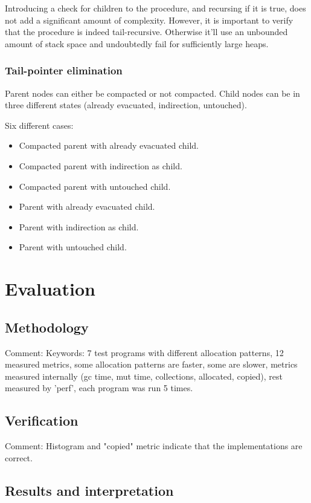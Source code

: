 \documentclass[a4paper,oneside]{memoir}
\newcommand{\makecomment}[1]{{\color{red} Comment: #1}}
\begin{document}
Introducing a check for children to the procedure, and recursing if it is true,
does not add a significant amount of complexity. However, it is important to
verify that the procedure is indeed tail-recursive. Otherwise it'll use an
unbounded amount of stack space and undoubtedly fail for sufficiently large
heaps.

\subsection{Tail-pointer elimination}


Parent nodes can either be compacted or not compacted. Child nodes can be in
three different states (already evacuated, indirection, untouched).

Six different cases:
\begin{itemize}
  \item Compacted parent with already evacuated child.
  \item Compacted parent with indirection as child.
  \item Compacted parent with untouched child.
  \item Parent with already evacuated child.
  \item Parent with indirection as child.
  \item Parent with untouched child.
\end{itemize}

\chapter{Evaluation}

\section{Methodology}
\makecomment{Keywords: 7 test programs with different allocation patterns, 12 measured metrics,
some allocation patterns are faster, some are slower, metrics measured internally
(gc time, mut time, collections, allocated, copied), rest measured
by 'perf', each program was run 5 times.}

\section{Verification}

\makecomment{Histogram and "copied" metric indicate that the implementations
are correct.}

\section{Results and interpretation}
\end{document}

